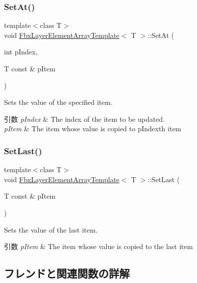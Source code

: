\subsubsection{\texorpdfstring{Set\+At()}{SetAt()}}
{\footnotesize\ttfamily template$<$class T$>$ \\
void \hyperlink{class_fbx_layer_element_array_template}{Fbx\+Layer\+Element\+Array\+Template}$<$ T $>$\+::Set\+At (\begin{DoxyParamCaption}\item[{int}]{p\+Index,  }\item[{T const \&}]{p\+Item }\end{DoxyParamCaption})}

Sets the value of the specified item. 
\begin{DoxyParams}{引数}
{\em p\+Index} & The index of the item to be updated. \\
\hline
{\em p\+Item} & The item whose value is copied to p\+Index\textquotesingle{}th item \\
\hline
\end{DoxyParams}
\mbox{\label{class_fbx_layer_element_array_template_a90c76493799f15b6345c83dc242f7b7c}} 
\subsubsection{\texorpdfstring{Set\+Last()}{SetLast()}}
{\footnotesize\ttfamily template$<$class T$>$ \\
void \hyperlink{class_fbx_layer_element_array_template}{Fbx\+Layer\+Element\+Array\+Template}$<$ T $>$\+::Set\+Last (\begin{DoxyParamCaption}\item[{T const \&}]{p\+Item }\end{DoxyParamCaption})}

Sets the value of the last item. 
\begin{DoxyParams}{引数}
{\em p\+Item} & The item whose value is copied to the last item \\
\hline
\end{DoxyParams}


\subsection{フレンドと関連関数の詳解}
\mbox{\label{class_fbx_layer_element_array_template_a63a2f2e250c191762d21c915d679bbc9}} 
